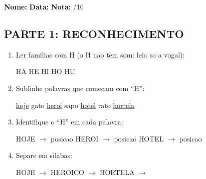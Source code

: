 \begin{exercicio}
\noindent\textbf{Nome:} \underline{\hspace{3.2cm}} \quad \textbf{Data:} \underline{\hspace{1.6cm}} \quad \textbf{Nota:} \underline{\hspace{0.9cm}}/10

\subsection*{PARTE 1: RECONHECIMENTO}

\begin{enumerate}
  \item Ler familias com H (o H nao tem som: leia so a vogal):
  \begin{center}
  HA \quad HE \quad HI \quad HO \quad HU
  \end{center}

  \item Sublinhe palavras que comecam com ``H'':
  \begin{center}
  \uline{hoje} \quad gato \quad \uline{heroi} \quad sapo \quad \uline{hotel} \quad rato \quad \uline{hortela}
  \end{center}

  \item Identifique o ``H'' em cada palavra:
  \begin{center}
  HOJE $\rightarrow$ posicao \underline{\hspace{1cm}} \quad HEROI $\rightarrow$ posicao \underline{\hspace{1cm}} \quad HOTEL $\rightarrow$ posicao \underline{\hspace{1cm}}
  \end{center}

  \item Separe em silabas:
  \begin{center}
  HOJE $\rightarrow$ \underline{\hspace{1cm}} \underline{\hspace{1cm}} \quad HEROICO $\rightarrow$ \underline{\hspace{1cm}} \underline{\hspace{1cm}} \underline{\hspace{1cm}} \underline{\hspace{1cm}} \quad HORTELA $\rightarrow$ \underline{\hspace{1cm}} \underline{\hspace{1cm}} \underline{\hspace{1cm}}
  \end{center}


\end{enumerate}
\end{exercicio}
